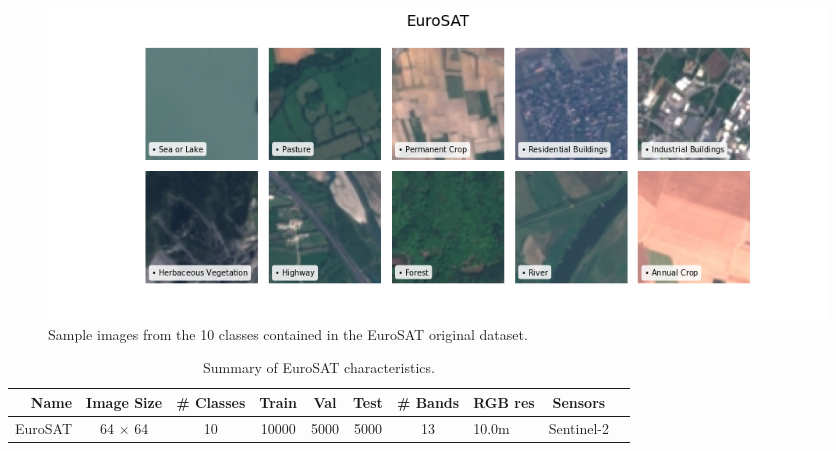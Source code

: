 \documentclass[a4paper, oneside, english]{sapthesis} %
\begin{document}
\begin{figure}[h]
    \centering
    \includegraphics[width=\textwidth]{img/EuroSAT_image_grid.png}
    \caption{Sample images from the 10 classes contained in the EuroSAT original dataset.}
    \label{fig:eurosatgrid}
\end{figure}


\begin{table}[ht]
\centering
\footnotesize
\renewcommand{\arraystretch}{1.2}
    \begin{tabular}{rcccccclcl}
    \toprule
    Name & Image Size & \# Classes & Train & Val & Test & \# Bands & RGB res & Sensors  \\
    \midrule
    EuroSAT & 64 $\times$ 64 & 10 & 10000 & 5000 & 5000 & 13 & 10.0m & Sentinel-2 \\
    \bottomrule
    \end{tabular}
\vspace{0.3cm}
\caption{\normalsize Summary of EuroSAT characteristics.}
\label{tab:euclasstypes}
\end{table}
\end{document}
